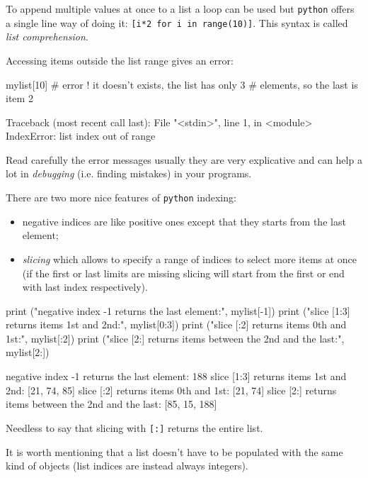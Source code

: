 To append multiple values at once to a list a loop can be used but \texttt{python} offers a single line way of doing it: \texttt{[i*2 for i in range(10)]}. This syntax is called \emph{list comprehension}.

Accessing items outside the list range gives an error:

\begin{ipython}
mylist[10] # error ! it doesn't exists, the list has only 3
           # elements, so the last is item 2
\end{ipython}
\begin{ioutput}
Traceback (most recent call last):
  File "<stdin>", line 1, in <module>
IndexError: list index out of range
\end{ioutput}

Read carefully the error messages usually they are very explicative and can help a lot in \emph{debugging} (i.e. finding mistakes) in your programs.

There are two more nice features of \texttt{python} indexing:

\begin{itemize}
\tightlist
\item negative indices are like positive ones except that they starts from the last element;
\item \emph{slicing} which allows to specify a range of indices to select more items at once (if the first or last limits are missing slicing will start from the first or end with last index respectively).
\end{itemize}

\begin{ipython}
print ("negative index -1 returns the last element:", mylist[-1])
print ("slice [1:3] returns items 1st and 2nd:", mylist[0:3])
print ("slice [:2] returns items 0th and 1st:", mylist[:2])
print ("slice [2:] returns items between the 2nd and the last:", mylist[2:])
\end{ipython}
\begin{ioutput}
negative index -1 returns the last element: 188
slice [1:3] returns items 1st and 2nd: [21, 74, 85]
slice [:2] returns items 0th and 1st: [21, 74]
slice [2:] returns items between the 2nd and the last: [85, 15, 188]
\end{ioutput}
\noindent
Needless to say that slicing with \texttt{[:]} returns the entire list.

It is worth mentioning that a list doesn't have to be populated with the same kind of objects (list indices are instead always integers).

